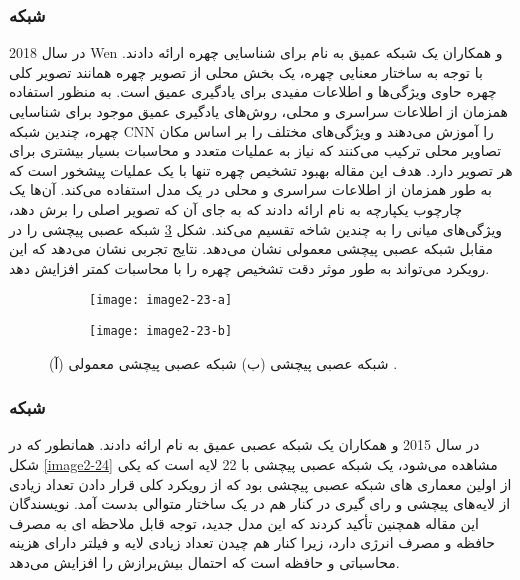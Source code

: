 \subsubsection{	شبکه }
در سال 2018 Wen و همکاران \cite{WEN201894} یک شبکه عمیق به نام  برای شناسایی چهره ارائه دادند. با توجه به ساختار معنایی چهره، یک بخش محلی از تصویر چهره همانند تصویر کلی چهره حاوی ویژگی‌ها و اطلاعات مفیدی برای یادگیری عمیق است. به منظور استفاده همزمان از اطلاعات سراسری و محلی، روش‌های یادگیری عمیق موجود برای شناسایی چهره، چندین شبکه CNN را آموزش می‌دهند و ویژگی‌های مختلف را بر اساس مکان تصاویر محلی ترکیب می‌کنند که نیاز به عملیات متعدد و محاسبات بسیار بیشتری برای هر تصویر دارد. هدف این مقاله بهبود تشخیص چهره تنها با یک عملیات پیشخور  است که به طور همزمان از اطلاعات سراسری و محلی در یک مدل استفاده می‌کند. آن‌ها یک چارچوب یکپارچه به نام  ارائه دادند که به جای آن که تصویر اصلی را برش دهد، ویژگی‌های میانی را به چندین شاخه تقسیم می‌کند. شکل ‏\ref{image2-23} شبکه عصبی پیچشی  را در مقابل شبکه عصبی پیچشی معمولی نشان می‌دهد. نتایج تجربی نشان می‌دهد که این رویکرد می‌تواند به طور موثر دقت تشخیص چهره را با محاسبات کمتر افزایش دهد. 

\begin{figure}
\begin{subfigure}{.5\textwidth}
  \centering
  \texttt{[image: image2-23-a]}
  \caption{ }
  \label{image2-23-a}
\end{subfigure}
\begin{subfigure}{.5\textwidth}
  \centering
  \texttt{[image: image2-23-b]}
  \caption{ }
  \label{image2-23-b}
\end{subfigure}
  \caption{ (آ) شبکه عصبی پیچشی   (ب) شبکه عصبی پیچشی معمولی \cite{WEN201894}.}
\label{image2-23}
\end{figure}

\subsubsection{	شبکه }
در سال 2015  و همکاران \cite{7298594} یک شبکه عصبی عمیق به نام  ارائه دادند. همانطور که در شکل \ref{image2-24} مشاهده می‌شود،  یک شبکه عصبی پیچشی با 22 لایه است که یکی از اولین معماری های شبکه عصبی پیچشی بود که از رویکرد کلی قرار دادن تعداد زیادی از لایه‌های پیچشی و رای گیری  در کنار هم در یک ساختار متوالی بدست آمد. نویسندگان این مقاله همچنین تأکید کردند که این مدل جدید، توجه قابل ملاحظه ای به مصرف حافظه و مصرف انرژی دارد، زیرا کنار هم چیدن تعداد زیادی لایه و فیلتر دارای هزینه محاسباتی و حافظه است که احتمال بیش‌برازش  را افزایش می‌دهد.
 
